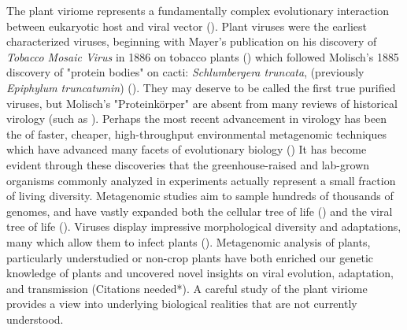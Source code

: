 \documentclass[11pt,letterpaper,titlepage]{article}
\begin{document}
\begin{linenumbers}
The plant viriome represents a fundamentally complex evolutionary interaction between eukaryotic host and viral vector (\cite{delwart_viral_2007}). 
Plant viruses were the earliest characterized viruses, beginning with Mayer's publication on his discovery of \textit{Tobacco Mosaic Virus} in 1886 on tobacco plants (\cite{mayer1886mosaikkrankheit}) which followed Molisch's 1885 discovery of "protein bodies" on cacti: \textit{Schlumbergera truncata}, (previously \textit{Epiphylum truncatumin}) (\cite{molisch1885merkwurdige}). 
They may deserve to be called the first true purified viruses, but Molisch's "Proteinkörper" are absent from many reviews of historical virology (such as \cite{LECOQ2001929, lefeuvre_evolution_2019}).
Perhaps the most recent advancement in virology has been the of faster, cheaper, high-throughput environmental metagenomic techniques which have advanced many facets of evolutionary biology (\cite{delwart_viral_2007, lefeuvre_evolution_2019, schulz_towards_2017})
It has become evident through these discoveries that the greenhouse-raised and lab-grown organisms commonly analyzed in experiments actually represent a small fraction of living diversity. 
Metagenomic studies aim to sample hundreds of thousands of genomes, and have vastly expanded both the cellular tree of life (\cite{schulz_towards_2017, hug_new_2016}) and the viral tree of life (\cite{gregory_marine_2019, lefeuvre_evolution_2019, shi_redefining_2016}).  
Viruses display impressive morphological diversity and adaptations, many which allow them to infect plants (\cite{delwart_viral_2007, lefeuvre_evolution_2019}).
 Metagenomic analysis of plants, particularly understudied or non-crop plants have both enriched our genetic knowledge of plants and uncovered novel insights on viral evolution, adaptation, and transmission (Citations needed*). 
 A careful study of the plant viriome provides a view into underlying biological realities that are not currently understood.


\end{linenumbers}
\end{document}
